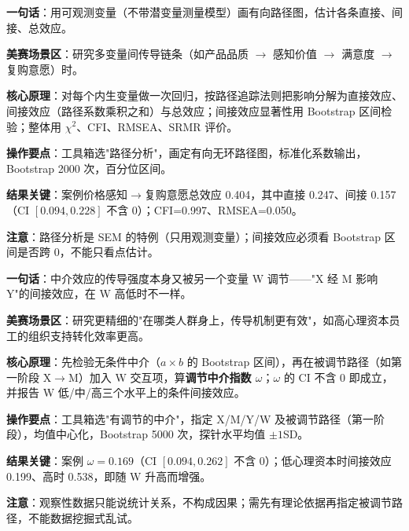 \begin{algobrief}
\textbf{一句话}：用可观测变量（不带潜变量测量模型）画有向路径图，估计各条直接、间接、总效应。

\textbf{美赛场景区}：研究多变量间传导链条（如产品品质 $\to$ 感知价值 $\to$ 满意度 $\to$ 复购意愿）时。

\textbf{核心原理}：对每个内生变量做一次回归，按路径追踪法则把影响分解为直接效应、间接效应（路径系数乘积之和）与总效应；间接效应显著性用 Bootstrap 区间检验；整体用 $\chi^2$、CFI、RMSEA、SRMR 评价。

\textbf{操作要点}：工具箱选"路径分析"，画定有向无环路径图，标准化系数输出，Bootstrap 2000 次，百分位区间。

\textbf{结果关键}：案例价格感知$\to$复购意愿总效应 0.404，其中直接 0.247、间接 0.157（CI $[0.094,0.228]$ 不含 0）；CFI=0.997、RMSEA=0.050。

\textbf{注意}：路径分析是 SEM 的特例（只用观测变量）；间接效应必须看 Bootstrap 区间是否跨 0，不能只看点估计。
\end{algobrief}


\begin{algobrief}
\textbf{一句话}：中介效应的传导强度本身又被另一个变量 W 调节——"X 经 M 影响 Y"的间接效应，在 W 高低时不一样。

\textbf{美赛场景区}：研究更精细的"在哪类人群身上，传导机制更有效"，如高心理资本员工的组织支持转化效率更高。

\textbf{核心原理}：先检验无条件中介（$a \times b$ 的 Bootstrap 区间），再在被调节路径（如第一阶段 X$\to$M）加入 W 交互项，算\textbf{调节中介指数 $\omega$}；$\omega$ 的 CI 不含 0 即成立，并报告 W 低/中/高三个水平上的条件间接效应。

\textbf{操作要点}：工具箱选"有调节的中介"，指定 X/M/Y/W 及被调节路径（第一阶段），均值中心化，Bootstrap 5000 次，探针水平均值 $\pm 1$SD。

\textbf{结果关键}：案例 $\omega=0.169$（CI $[0.094,0.262]$ 不含 0）；低心理资本时间接效应 0.199、高时 0.538，即随 W 升高而增强。

\textbf{注意}：观察性数据只能说统计关系，不构成因果；需先有理论依据再指定被调节路径，不能数据挖掘式乱试。
\end{algobrief}



